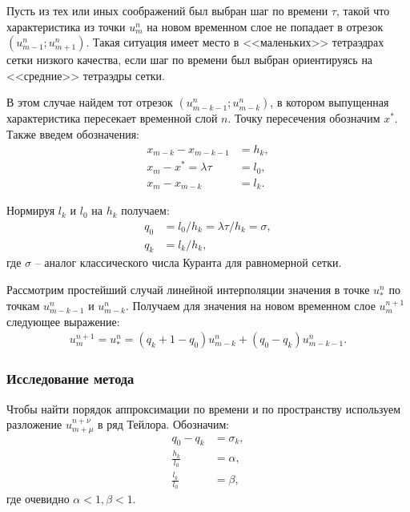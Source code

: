 Пусть из тех или иных соображений был выбран шаг по времени $\tau$, такой что характеристика из точки $u_m^n$ на новом временном слое не попадает в отрезок $(u_{m-1}^n; u_{m+1}^n)$. Такая ситуация имеет место в <<маленьких>> тетраэдрах сетки низкого качества, если шаг по времени был выбран ориентируясь на <<средние>> тетраэдры сетки.

В этом случае найдем тот отрезок $(u_{m-k-1}^n; u_{m-k}^n)$, в котором выпущенная характеристика пересекает временной слой $n$. Точку пересечения обозначим $x^*$. Также введем обозначения:
\begin{align}
x_{m-k} - x_{m-k-1} &= h_k,\nonumber\\
x_m - x^* = \lambda \tau &= l_0,\nonumber\\
x_m - x_{m-k} &= l_k.
\end{align}

Нормируя $l_k$ и $l_0$ на $h_k$ получаем:
\begin{align}
q_0 &= l_0 / h_k = \lambda \tau / h_k = \sigma,\nonumber\\
q_k &= l_k / h_k,
\end{align}
где $\sigma$ -- аналог классического числа Куранта для равномерной сетки.

Рассмотрим простейший случай линейной интерполяции значения в точке $u_*^n$ по точкам  $u_{m-k-1}^n$ и $u_{m-k}^n$. Получаем для значения на новом временном слое $u_m^{n+1}$ следующее выражение:
\begin{align}
\label{newmethod_1d_scheme}
u_m^{n+1} = u_*^n = (q_k + 1 - q_0) u_{m-k}^n + (q_0 - q_k) u_{m-k-1}^n.
\end{align}


\subsubsection{Исследование метода}

Чтобы найти порядок аппроксимации по времени и по пространству используем разложение $u_{m+\mu}^{n+\nu}$ в ряд Тейлора. Обозначим:
\begin{align}
q_0 - q_k &= \sigma_k,\nonumber\\
\frac{h_k}{l_0} &= \alpha,\nonumber\\
\frac{l_k}{l_0} &= \beta,
\end{align}
где очевидно $\alpha < 1, \beta < 1$.

